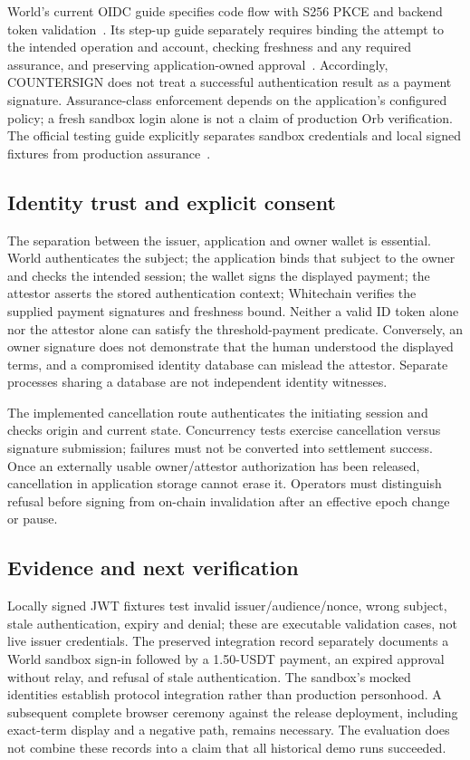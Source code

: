 \documentclass[11pt]{article}
\begin{document}
World's current OIDC guide specifies code flow with S256 PKCE and backend token validation~\cite{worldoidc}. Its step-up guide separately requires binding the attempt to the intended operation and account, checking freshness and any required assurance, and preserving application-owned approval~\cite{worldstepup}. Accordingly, COUNTERSIGN does not treat a successful authentication result as a payment signature. Assurance-class enforcement depends on the application's configured policy; a fresh sandbox login alone is not a claim of production Orb verification. The official testing guide explicitly separates sandbox credentials and local signed fixtures from production assurance~\cite{worldtesting}.

\subsection{Identity trust and explicit consent}
The separation between the issuer, application and owner wallet is essential. World authenticates the subject; the application binds that subject to the owner and checks the intended session; the wallet signs the displayed payment; the attestor asserts the stored authentication context; Whitechain verifies the supplied payment signatures and freshness bound. Neither a valid ID token alone nor the attestor alone can satisfy the threshold-payment predicate. Conversely, an owner signature does not demonstrate that the human understood the displayed terms, and a compromised identity database can mislead the attestor. Separate processes sharing a database are not independent identity witnesses.

The implemented cancellation route authenticates the initiating session and checks origin and current state. Concurrency tests exercise cancellation versus signature submission; failures must not be converted into settlement success. Once an externally usable owner/attestor authorization has been released, cancellation in application storage cannot erase it. Operators must distinguish refusal before signing from on-chain invalidation after an effective epoch change or pause.

\subsection{Evidence and next verification}
Locally signed JWT fixtures test invalid issuer/audience/nonce, wrong subject, stale authentication, expiry and denial; these are executable validation cases, not live issuer credentials. The preserved integration record separately documents a World sandbox sign-in followed by a 1.50-USDT payment, an expired approval without relay, and refusal of stale authentication. The sandbox's mocked identities establish protocol integration rather than production personhood. A subsequent complete browser ceremony against the release deployment, including exact-term display and a negative path, remains necessary. The evaluation does not combine these records into a claim that all historical demo runs succeeded.
\end{document}
